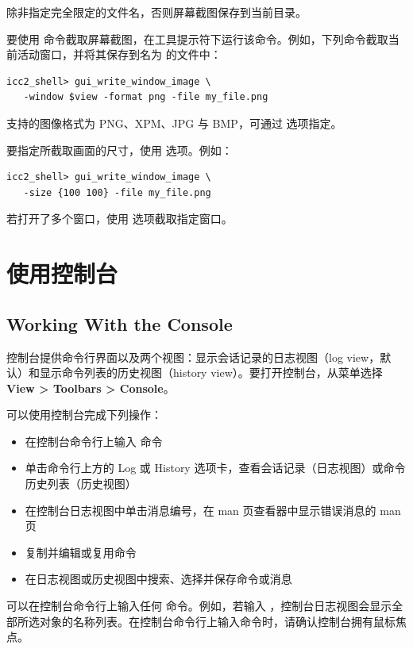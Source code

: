 除非指定完全限定的文件名，否则屏幕截图保存到当前目录。

要使用  命令截取屏幕截图，在工具提示符下运行该命令。例如，下列命令截取当前活动窗口，并将其保存到名为  的文件中：
\begin{lstlisting}
icc2_shell> gui_write_window_image \
   -window $view -format png -file my_file.png
\end{lstlisting}

支持的图像格式为 PNG、XPM、JPG 与 BMP，可通过  选项指定。

要指定所截取画面的尺寸，使用  选项。例如：
\begin{lstlisting}
icc2_shell> gui_write_window_image \
   -size {100 100} -file my_file.png
\end{lstlisting}

若打开了多个窗口，使用  选项截取指定窗口。

\section{使用控制台}
\subsection*{Working With the Console}

控制台提供命令行界面以及两个视图：显示会话记录的日志视图（log view，默认）和显示命令列表的历史视图（history view）。要打开控制台，从菜单选择 \textbf{View > Toolbars > Console}。

可以使用控制台完成下列操作：
\begin{itemize}
  \item 在控制台命令行上输入  命令
  \item 单击命令行上方的 Log 或 History 选项卡，查看会话记录（日志视图）或命令历史列表（历史视图）
  \item 在控制台日志视图中单击消息编号，在 man 页查看器中显示错误消息的 man 页
  \item 复制并编辑或复用命令
  \item 在日志视图或历史视图中搜索、选择并保存命令或消息
\end{itemize}

可以在控制台命令行上输入任何  命令。例如，若输入 ，控制台日志视图会显示全部所选对象的名称列表。在控制台命令行上输入命令时，请确认控制台拥有鼠标焦点。

